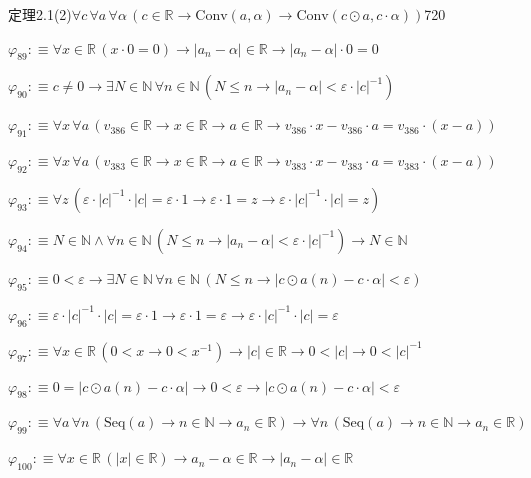 \begin{fullproof}{定理2.1(2)}{$\forall c\,\forall a\,\forall \alpha\,(c \in \mathbb{R} \to \mathrm{Conv}(a,\alpha) \to \mathrm{Conv}(c \odot a,c \cdot \alpha))$}{720}
\begin{abbrevlist}
\item $\varphi_{89} :\equiv \forall x \in \mathbb{R}\,(x \cdot 0 = 0) \to \lvert a_{n} - \alpha \rvert \in \mathbb{R} \to \lvert a_{n} - \alpha \rvert \cdot 0 = 0$
\item $\varphi_{90} :\equiv c \neq 0 \to \exists N \in \mathbb{N}\,\forall n \in \mathbb{N}\,(N \leq n \to \lvert a_{n} - \alpha \rvert < \varepsilon \cdot \lvert c \rvert^{-1})$
\item $\varphi_{91} :\equiv \forall x\,\forall a\,(v_{386} \in \mathbb{R} \to x \in \mathbb{R} \to a \in \mathbb{R} \to v_{386} \cdot x - v_{386} \cdot a = v_{386} \cdot (x - a))$
\item $\varphi_{92} :\equiv \forall x\,\forall a\,(v_{383} \in \mathbb{R} \to x \in \mathbb{R} \to a \in \mathbb{R} \to v_{383} \cdot x - v_{383} \cdot a = v_{383} \cdot (x - a))$
\item $\varphi_{93} :\equiv \forall z\,(\varepsilon \cdot \lvert c \rvert^{-1} \cdot \lvert c \rvert = \varepsilon \cdot 1 \to \varepsilon \cdot 1 = z \to \varepsilon \cdot \lvert c \rvert^{-1} \cdot \lvert c \rvert = z)$
\item $\varphi_{94} :\equiv N \in \mathbb{N} \land \forall n \in \mathbb{N}\,(N \leq n \to \lvert a_{n} - \alpha \rvert < \varepsilon \cdot \lvert c \rvert^{-1}) \to N \in \mathbb{N}$
\item $\varphi_{95} :\equiv 0 < \varepsilon \to \exists N \in \mathbb{N}\,\forall n \in \mathbb{N}\,(N \leq n \to \lvert c \odot a(n) - c \cdot \alpha \rvert < \varepsilon)$
\item $\varphi_{96} :\equiv \varepsilon \cdot \lvert c \rvert^{-1} \cdot \lvert c \rvert = \varepsilon \cdot 1 \to \varepsilon \cdot 1 = \varepsilon \to \varepsilon \cdot \lvert c \rvert^{-1} \cdot \lvert c \rvert = \varepsilon$
\item $\varphi_{97} :\equiv \forall x \in \mathbb{R}\,(0 < x \to 0 < x^{-1}) \to \lvert c \rvert \in \mathbb{R} \to 0 < \lvert c \rvert \to 0 < \lvert c \rvert^{-1}$
\item $\varphi_{98} :\equiv 0 = \lvert c \odot a(n) - c \cdot \alpha \rvert \to 0 < \varepsilon \to \lvert c \odot a(n) - c \cdot \alpha \rvert < \varepsilon$
\item $\varphi_{99} :\equiv \forall a\,\forall n\,(\mathrm{Seq}(a) \to n \in \mathbb{N} \to a_{n} \in \mathbb{R}) \to \forall n\,(\mathrm{Seq}(a) \to n \in \mathbb{N} \to a_{n} \in \mathbb{R})$
\item $\varphi_{100} :\equiv \forall x \in \mathbb{R}\,(\lvert x \rvert \in \mathbb{R}) \to a_{n} - \alpha \in \mathbb{R} \to \lvert a_{n} - \alpha \rvert \in \mathbb{R}$

\end{abbrevlist}
\end{fullproof}
